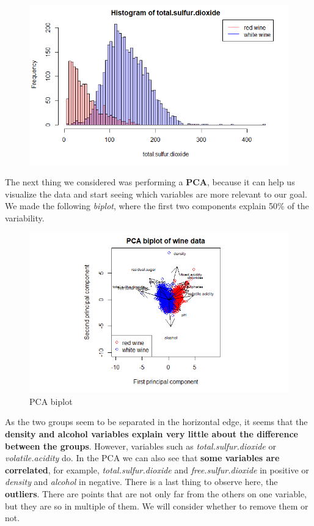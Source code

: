 \documentclass[10pt]{article}
\begin{document}
\begin{figure}[H]
\includegraphics[scale=0.35]{histogram_of_totalsulfurdioxide}
\end{figure}
The next thing we considered was performing a \textbf{PCA}, because it can help us visualize the data and start seeing which variables are more relevant to our goal. We made the following \textit{biplot}, where the first two components explain 50\% of the variability.
\begin{figure}[H]
\centering
\caption{PCA biplot}
\includegraphics[scale=0.75]{PCA_biplot}
\end{figure}
As the two groups seem to be separated in the horizontal edge, it seems that the \textbf{density and alcohol variables explain very little about the difference between the groups}. However, variables such as \textit{total.sulfur.dioxide} or \textit{volatile.acidity} do. In the PCA we can also see that \textbf{some variables are correlated}, for example, \textit{total.sulfur.dioxide} and \textit{free.sulfur.dioxide} in positive or \textit{density} and \textit{alcohol} in negative. There is a last thing to observe here, the \textbf{outliers}. There are points that are not only far from the others on one variable, but they are so in multiple of them. We will consider whether to remove them or not.   \\
\end{document}

